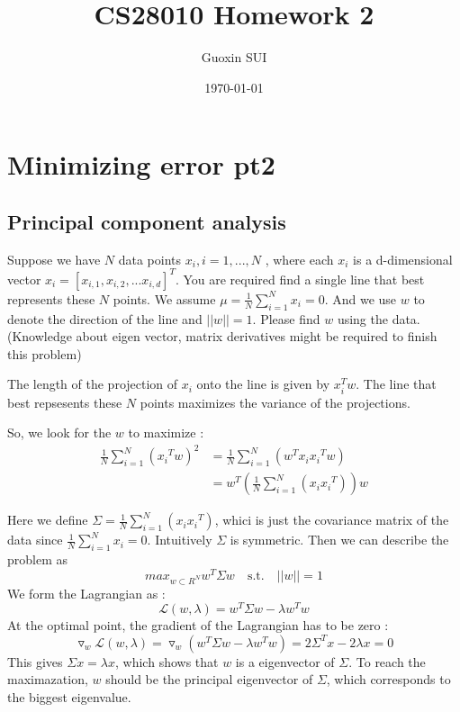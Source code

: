 \documentclass{article}
\title{CS28010 Homework 2}
\author{Guoxin SUI}
\date{\today}
\newenvironment{answer}{\par\color{ForestGreen}}{\par}
\begin{document}
\maketitle

\section{Minimizing error pt2}
\subsection{Principal component analysis}
Suppose we have $N$ data points $x_i , i = 1,... , N$ , where each $x_i$ is a d-dimensional vector
$x_i = [x_{i,1}, x_{i,2},... x_{i,d}]^T$. You are required find a single line that best represents these $N$
points. We assume $\mu = \frac{1}{N} \sum_{i=1}^Nx_i = 0$.
And we use $w$ to denote the direction of the line and $||w|| = 1$. Please find $w$ using the data. (Knowledge about eigen vector, matrix derivatives might be required to finish this problem)

\begin{answer}
The length of the projection of $x_i$ onto the line is given by $x_i^Tw$. The line that best repsesents these $N$ points maximizes the variance of the projections.

So, we look for the $w$ to maximize : \begin{align*}
    \frac{1}{N} \sum_{i=1}^N({x_i}^Tw)^2 &= \frac{1}{N} \sum_{i=1}^N(w^Tx_i{x_i}^Tw) \\
                                         &= w^T\left(\frac{1}{N} \sum_{i=1}^N(x_i{x_i}^T)\right)w
     \end{align*}

Here we define $\Sigma = \frac{1}{N} \sum_{i=1}^N(x_i{x_i}^T)$, whici is just the covariance matrix of the data since $\frac{1}{N} \sum_{i=1}^Nx_i = 0$. Intuitively $\Sigma$ is symmetric. Then we can describe the problem as
$$ max_{w \subset R^N} w^T\Sigma w \quad \textrm{s.t.} \quad ||w|| = 1$$
We form the Lagrangian as : $$\mathcal{L}(w, \lambda) = w^T\Sigma w -\lambda w^Tw $$
At the optimal point, the gradient of the Lagrangian has to be zero :
$$\triangledown_w\mathcal{L}(w, \lambda) = \triangledown_w(w^T\Sigma w -\lambda w^Tw) = 2\Sigma^Tx - 2\lambda x = 0 $$
This gives $\Sigma x = \lambda x$, which shows that $w$ is a eigenvector of $\Sigma$.
To reach the maximazation, $w$ should be the principal eigenvector of $\Sigma$, which corresponds to the biggest eigenvalue.

\end{answer}
\end{document}

